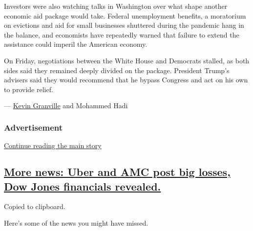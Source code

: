Investors were also watching talks in Washington over what shape another
economic aid package would take. Federal unemployment benefits, a
moratorium on evictions and aid for small businesses shuttered during
the pandemic hang in the balance, and economists have repeatedly warned
that failure to extend the assistance could imperil the American
economy.

On Friday, negotiations between the White House and Democrats stalled,
as both sides said they remained deeply divided on the package.
President Trump's advisers said they would recommend that he bypass
Congress and act on his own to provide relief.

--- \href{https://www.nytimes3xbfgragh.onion/by/kevin-granville}{Kevin
Granville} and Mohammed Hadi

\hypertarget{advertisement-2}{%
\subsubsection{Advertisement}\label{advertisement-2}}

\protect\hyperlink{after-dfp-ad-mid3}{Continue reading the main story}

\hypertarget{more-news-uber-and-amc-post-big-losses-dow-jones-financials-revealed}{%
\subsection{\texorpdfstring{\protect\hyperlink{more-news-uber-and-amc-post-big-losses-dow-jones-financials-revealed}{More
news: Uber and AMC post big losses, Dow Jones financials
revealed.}}{More news: Uber and AMC post big losses, Dow Jones financials revealed.}}\label{more-news-uber-and-amc-post-big-losses-dow-jones-financials-revealed}}

Copied to clipboard.

Here's some of the news you might have missed.

